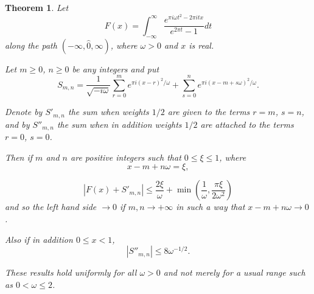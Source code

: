 \documentclass[12pt]{article}
\newtheorem{theorem}{Theorem}[section]
\theoremstyle{remark}
\begin{document}
\begin{theorem}\label{thm:approximate_functional}
Let
\begin{equation}\label{eq:F_definition}
F(x) = \int_{-\infty}^\infty \frac{e^{\pi i\omega t^2 - 2\pi itx}}{e^{2\pi t} - 1} dt
\end{equation}
along the path $(-\infty, \hat{0}, \infty)$, where $\omega > 0$ and $x$ is real.

Let $m \geq 0$, $n \geq 0$ be any integers and put
\begin{equation}\label{eq:S_mn_definition}
S_{m,n} = \frac{1}{\sqrt{-i\omega}} \sum_{r=0}^m e^{\pi i(x-r)^2/\omega} + \sum_{s=0}^n e^{\pi i(x-m+s\omega)^2/\omega}.
\end{equation}

Denote by $S'_{m,n}$ the sum when weights $1/2$ are given to the terms $r=m$, $s=n$, and by $S''_{m,n}$ the sum when in addition weights $1/2$ are attached to the terms $r = 0$, $s = 0$.

Then if $m$ and $n$ are positive integers such that $0 \leq \xi \leq 1$, where
\begin{equation}\label{eq:xi_definition}
x - m + n\omega = \xi,
\end{equation}

\begin{equation}\label{eq:approximate_bound}
|F(x) + S'_{m,n}| \leq \frac{2\xi}{\omega} + \min\left(\frac{1}{\omega}, \frac{\pi\xi}{2\omega^2}\right)
\end{equation}
and so the left hand side $\to 0$ if $m, n \to +\infty$ in such a way that $x - m + n\omega \to 0$.

Also if in addition $0 \leq x < 1$,
\begin{equation}\label{eq:approximate_bound2}
|S''_{m,n}| \leq 8\omega^{-1/2}.
\end{equation}

These results hold uniformly for all $\omega > 0$ and not merely for a usual range such as $0 < \omega \leq 2$.
\end{theorem}
\end{document}
